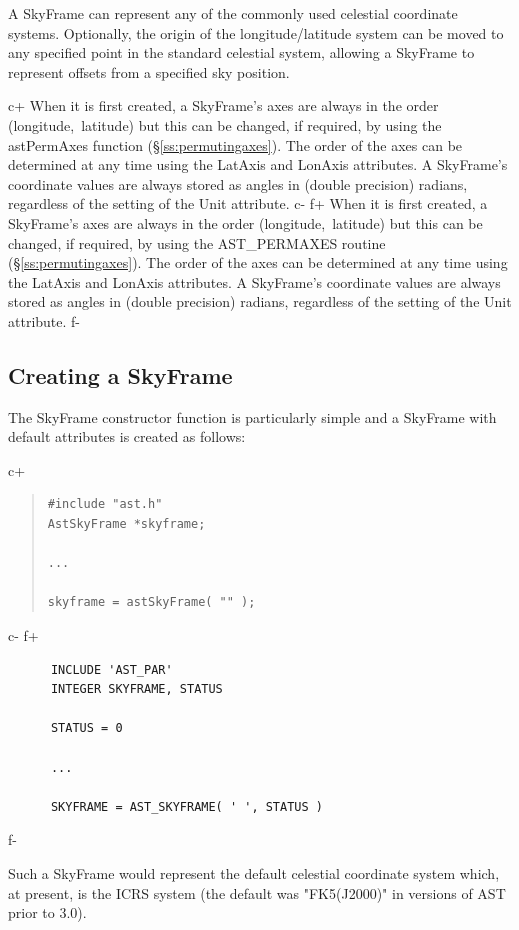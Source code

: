 \documentclass[twoside,11pt]{article}
\newcommand{\secref}[1]{\S\ref{#1}}
\newcommand{\secref}[1]{\ref{#1}}
\begin{document}
A SkyFrame can represent any of the commonly used celestial coordinate
systems. Optionally, the origin of the longitude/latitude system can be
moved to any specified point in the standard celestial system, allowing
a SkyFrame to represent offsets from a specified sky position.

c+
When it is first created, a SkyFrame's axes are always in the order
(longitude,~latitude) but this can be changed, if required, by using the
astPermAxes function (\secref{ss:permutingaxes}). The order of the axes
can be determined at any time using the LatAxis and LonAxis attributes. A
SkyFrame's coordinate values are always stored as angles in (double
precision) radians, regardless of the setting of the Unit attribute.
c-
f+
When it is first created, a SkyFrame's axes are always in the order
(longitude,~latitude) but this can be changed, if required, by using the
AST\_PERMAXES routine (\secref{ss:permutingaxes}). The order of the axes
can be determined at any time using the LatAxis and LonAxis attributes. A
SkyFrame's coordinate values are always stored as angles in (double
precision) radians, regardless of the setting of the Unit attribute.
f-

\subsection{Creating a SkyFrame}

The SkyFrame constructor function is particularly simple and a
SkyFrame with default attributes is created as follows:

c+
\begin{quote}
\small
\begin{verbatim}
#include "ast.h"
AstSkyFrame *skyframe;

...

skyframe = astSkyFrame( "" );
\end{verbatim}
\normalsize
\end{quote}
c-
f+
\small
\begin{verbatim}
      INCLUDE 'AST_PAR'
      INTEGER SKYFRAME, STATUS

      STATUS = 0

      ...

      SKYFRAME = AST_SKYFRAME( ' ', STATUS )
\end{verbatim}
\normalsize
f-

Such a SkyFrame would represent the default celestial coordinate
system which, at present, is the ICRS system (the default was "FK5(J2000)"
in versions of AST prior to 3.0).
\end{document}
